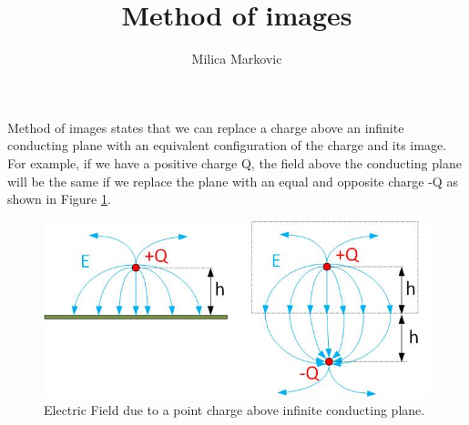 \documentclass{ximera}
\title{Method of images}
\author{Milica Markovic}
\begin{document}
  
\begin{abstract}  

\end{abstract}  
\maketitle    

   

Method of images states that we can replace a charge above an infinite conducting plane with an equivalent configuration of the charge and its image. For example, if we have a positive charge Q, the field above the conducting plane will be the same if we replace the plane with an equal and opposite charge -Q as shown in Figure \ref{fig:imageMethod}. 





\begin{figure}[htbp]
\begin{center}
\includegraphics[scale=1.6]{../jpg/methodOfImages.jpg}
\end{center}
\caption{Electric Field due to a point charge above infinite conducting plane. }
\label{fig:imageMethod}
\end{figure}
\end{document}
